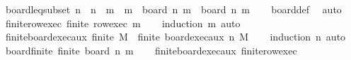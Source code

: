 \begin{isabellebody}
\isamarkupfalse%
\ board{\isacharunderscore}{\kern0pt}leq{\isacharunderscore}{\kern0pt}subset{\isacharcolon}{\kern0pt}\ {\isachardoublequoteopen}n\ {\isasymle}\ n\ {\isasymand}\ m\ {\isasymle}\ m\ {\isasymLongrightarrow}\ board\ n\ m\ {\isasymsubseteq}\ board\ n\ m\isanewline
%
\isadelimproof
\ \ %
\endisadelimproof
%
\isatagproof
{}\isamarkupfalse%
\ board{\isacharunderscore}{\kern0pt}def\ \isamarkupfalse%
\ auto%
\endisatagproof
{\isafoldproof}%
%
\isadelimproof
\isanewline
%
\endisadelimproof
\isanewline
{}\isamarkupfalse%
\ finite{\isacharunderscore}{\kern0pt}row{\isacharunderscore}{\kern0pt}exec{\isacharcolon}{\kern0pt}\ {\isachardoublequoteopen}finite\ {\isacharparenleft}{\kern0pt}row{\isacharunderscore}{\kern0pt}exec\ m{\isacharparenright}{\kern0pt}{\isachardoublequoteclose}\isanewline
%
\isadelimproof
\ \ %
\endisadelimproof
%
\isatagproof
{}\isamarkupfalse%
\ {\isacharparenleft}{\kern0pt}induction\ m{\isacharparenright}{\kern0pt}\ auto%
\endisatagproof
{\isafoldproof}%
%
\isadelimproof
\isanewline
%
\endisadelimproof
\isanewline
{}\isamarkupfalse%
\ finite{\isacharunderscore}{\kern0pt}board{\isacharunderscore}{\kern0pt}exec{\isacharunderscore}{\kern0pt}aux{\isacharcolon}{\kern0pt}\ {\isachardoublequoteopen}finite\ M\ {\isasymLongrightarrow}\ finite\ {\isacharparenleft}{\kern0pt}board{\isacharunderscore}{\kern0pt}exec{\isacharunderscore}{\kern0pt}aux\ n\ M{\isacharparenright}{\kern0pt}{\isachardoublequoteclose}\isanewline
%
\isadelimproof
\ \ %
\endisadelimproof
%
\isatagproof
{}\isamarkupfalse%
\ {\isacharparenleft}{\kern0pt}induction\ n{\isacharparenright}{\kern0pt}\ auto%
\endisatagproof
{\isafoldproof}%
%
\isadelimproof
\isanewline
%
\endisadelimproof
\isanewline
{}\isamarkupfalse%
\ board{\isacharunderscore}{\kern0pt}finite{\isacharcolon}{\kern0pt}\ {\isachardoublequoteopen}finite\ {\isacharparenleft}{\kern0pt}board\ n\ m{\isacharparenright}{\kern0pt}{\isachardoublequoteclose}\isanewline
%
\isadelimproof
\ \ %
\endisadelimproof
%
\isatagproof
{}\isamarkupfalse%
\ finite{\isacharunderscore}{\kern0pt}board{\isacharunderscore}{\kern0pt}exec{\isacharunderscore}{\kern0pt}aux\ finite{\isacharunderscore}{\kern0pt}row{\isacharunderscore}{\kern0pt}exec\ \isamarkupfalse%

\end{isabellebody}
